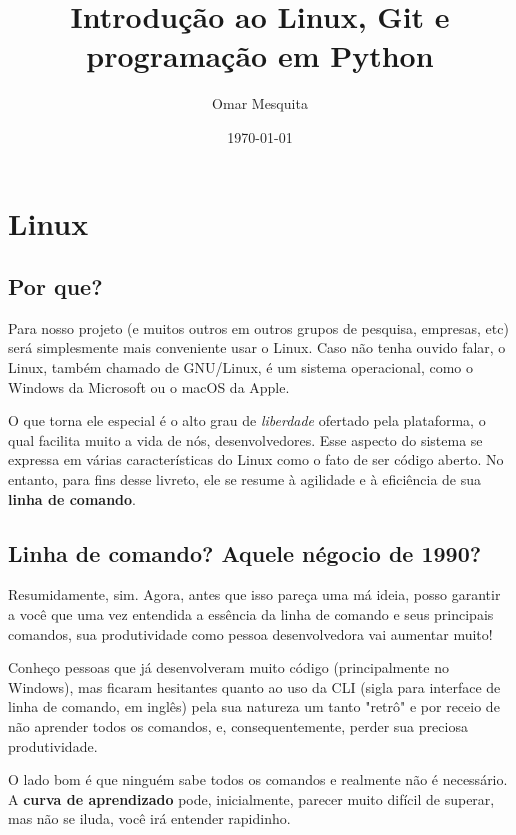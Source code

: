 \documentclass{article}
\begin{document}
	\title{Introdução ao Linux, Git e programação em Python}
	\date{\today}
	\author{Omar Mesquita}
	\maketitle
	
	\newpage
	\tableofcontents
	\newpage

	\section{Linux}
	\subsection{Por que?}
	
	Para nosso projeto (e muitos outros em outros grupos de pesquisa, empresas, etc) será simplesmente mais conveniente 
	usar o Linux. Caso não tenha ouvido falar, o Linux, também chamado de GNU/Linux, é um sistema operacional, como o 
	Windows da Microsoft ou o macOS da Apple. 


	O que torna ele especial é o alto grau de \textit{liberdade} ofertado pela plataforma, o qual facilita muito a vida de nós, 
	desenvolvedores. Esse aspecto do sistema se expressa em várias características do Linux como o fato de ser código aberto. 
	No entanto, para fins desse livreto, ele se resume à agilidade e à eficiência de sua \textbf{linha de comando}.

	\subsection{Linha de comando? Aquele négocio de 1990?} 

	Resumidamente, sim. Agora, antes que isso pareça uma má ideia, posso garantir a você que uma vez entendida a essência da
	linha de comando e seus principais comandos, sua produtividade como pessoa desenvolvedora vai aumentar muito! 

	Conheço pessoas que já desenvolveram muito código (principalmente no Windows), 
	mas ficaram hesitantes quanto ao uso da CLI (sigla para interface de linha de comando, em inglês) 
	pela sua natureza um tanto "retrô" e por receio de não aprender todos os comandos, e,
	consequentemente, perder sua preciosa produtividade. 

	O lado bom é que ninguém sabe todos os comandos e realmente não é necessário. A \textbf{curva de aprendizado} pode, 
	inicialmente, parecer muito difícil de superar, mas não se iluda, você irá entender rapidinho. 
\end{document}
